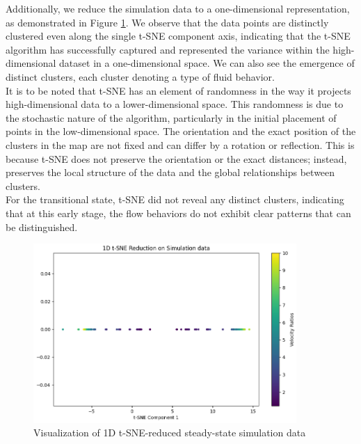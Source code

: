 Additionally, we reduce the simulation data to a one-dimensional representation, as demonstrated in Figure \ref{1dtsne}. We observe that the data points are distinctly clustered even along the single t-SNE component axis, indicating that the t-SNE algorithm has successfully captured and represented the variance within the high-dimensional dataset in a one-dimensional space. We can also see the emergence of distinct clusters, each cluster denoting a type of fluid behavior. \\
It is to be noted that t-SNE has an element of randomness in the way it projects high-dimensional data to a lower-dimensional space. This randomness is due to the stochastic nature of the algorithm, particularly in the initial placement of points in the low-dimensional space. The orientation and the exact position of the clusters in the map are not fixed and can differ by a rotation or reflection. This is because t-SNE does not preserve the orientation or the exact distances; instead, preserves the local structure of the data and the global relationships between clusters. \\
For the transitional state, t-SNE did not reveal any distinct clusters, indicating that at this early stage, the flow behaviors do not exhibit clear patterns that can be distinguished. 
\begin{figure}[ht]
    \centering
    \includegraphics[width=10cm]{images/Clustering/tsne_sim_1dcmap.png}
    \caption{Visualization of 1D t-SNE-reduced steady-state simulation data}
    \label{1dtsne}
    \end{figure}


